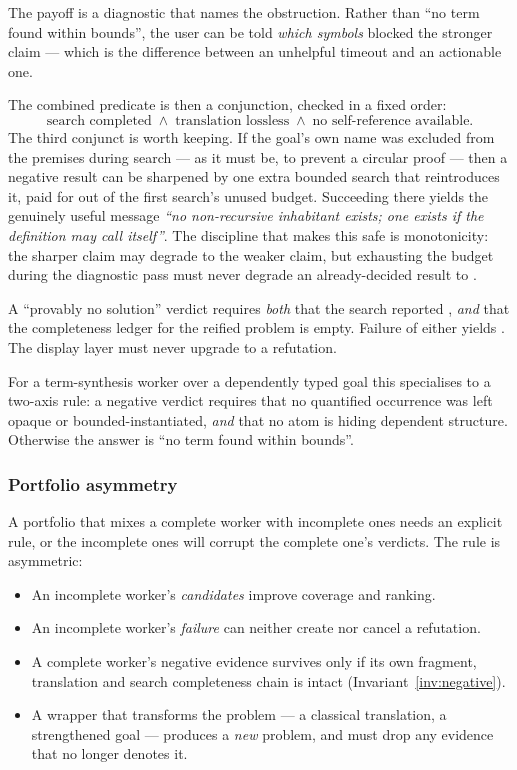 The payoff is a diagnostic that names the obstruction. Rather than ``no term
found within bounds'', the user can be told \emph{which symbols} blocked the
stronger claim --- which is the difference between an unhelpful timeout and an
actionable one.

The combined predicate is then a conjunction, checked in a fixed order:
\[
\text{search completed} \;\wedge\;
\text{translation lossless} \;\wedge\;
\text{no self-reference available} .
\]
The third conjunct is worth keeping. If the goal's own name was excluded from
the premises during search --- as it must be, to prevent a circular proof ---
then a negative result can be sharpened by one extra bounded search that
reintroduces it, paid for out of the first search's unused budget. Succeeding
there yields the genuinely useful message \emph{``no non-recursive inhabitant
exists; one exists if the definition may call itself''}. The discipline that
makes this safe is monotonicity: the sharper claim may degrade to the weaker
claim, but exhausting the budget during the diagnostic pass must never degrade
an already-decided result to \unknown{}.

\begin{invariant}
\label{inv:negative}
A ``provably no solution'' verdict requires \emph{both} that the search
reported , \emph{and} that the completeness ledger for the
reified problem is empty. Failure of either yields \unknown{}. The display layer
must never upgrade \unknown{} to a refutation.
\end{invariant}

For a term-synthesis worker over a dependently typed goal this specialises to a
two-axis rule: a negative verdict requires that no quantified occurrence was
left opaque or bounded-instantiated, \emph{and} that no atom is hiding
dependent structure. Otherwise the answer is ``no term found within bounds''.

\subsubsection*{Portfolio asymmetry}

A portfolio that mixes a complete worker with incomplete ones needs an explicit
rule, or the incomplete ones will corrupt the complete one's verdicts. The rule
is asymmetric:

\begin{itemize}[leftmargin=1.4em]
\item An incomplete worker's \emph{candidates} improve coverage and ranking.
\item An incomplete worker's \emph{failure} can neither create nor cancel a
  refutation.
\item A complete worker's negative evidence survives only if its own
  fragment, translation and search completeness chain is intact
  (Invariant~\ref{inv:negative}).
\item A wrapper that transforms the problem --- a classical translation, a
  strengthened goal --- produces a \emph{new} problem, and must drop any
  evidence that no longer denotes it.
\end{itemize}


